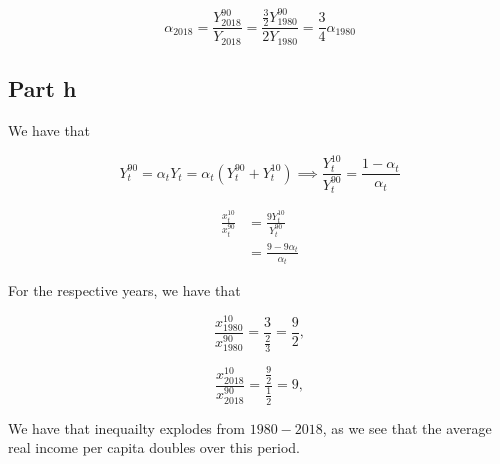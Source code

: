\documentclass[12pt,letterpaper]{article}
\theoremstyle{definition}
\begin{document}
\[
  \alpha_{2018} = \frac{Y_{2018}^{90}}{Y_{2018}} =
  \frac{\frac{3}{2}Y_{1980}^{90}}{2Y_{1980}} = \frac{3}{4}\alpha_{1980}
\]

\subsection*{Part h}

We have that

\[
  Y_t^{90} = \alpha_tY_t = \alpha_t(Y_t^{90} + Y_t^{10}) \implies
  \frac{Y_t^{10}}{Y_t^{90}} = \frac{1 - \alpha_t}{\alpha_t}
\]

\begin{align*}
  \frac{x_t^{10}}{x_t^{90}} &= \frac{9Y_t^{10}}{Y_t^{90}} \\
                            &= \frac{9 - 9\alpha_t}{\alpha_t}
\end{align*}

For the respective years, we have that

\[
  \frac{x_{1980}^{10}}{x_{1980}^{90}} = \frac{3}{\frac{2}{3}} = \frac{9}{2},
\]

\[
  \frac{x_{2018}^{10}}{x_{2018}^{90}} = \frac{\frac{9}{2}}{\frac{1}{2}} = 9, 
\]

We have that inequailty explodes from $1980 - 2018$, as we see that the average
real income per capita doubles over this period.
\end{document}
